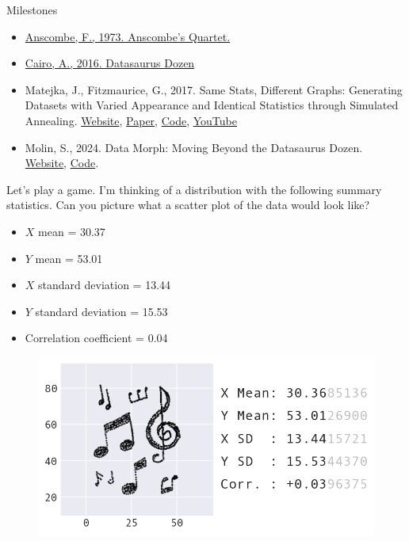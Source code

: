 \documentclass[10pt]{beamer}
\begin{document}
\begin{frame}{Milestones}
\begin{itemize}%
  \item\href{https://en.wikipedia.org/wiki/Anscombe\%27s_quartet}{Anscombe, F., 1973. Anscombe's Quartet.}
  \item\href{https://en.wikipedia.org/wiki/Datasaurus_dozen}{Cairo, A., 2016. Datasaurus Dozen} 
  \item Matejka, J., Fitzmaurice, G., 2017. Same Stats, Different Graphs: Generating Datasets with Varied Appearance and Identical Statistics through Simulated Annealing. \href{https://www.research.autodesk.com/publications/same-stats-different-graphs/}{Website}, \href{https://research.autodesk.com/app/uploads/2023/03/same-stats-different-graphs.pdf_rec2hRjLLGgM7Cn2T.pdf}{Paper}, \href{https://github.com/jmatejka/same-stats-different-graphs}{Code}, \href{https://www.youtube.com/watch?v=DbJyPELmhJc}{YouTube}
  \item Molin, S., 2024. Data Morph: Moving Beyond the Datasaurus Dozen. \href{https://stefaniemolin.com/articles/data-science/introducing-data-morph/}{Website}, \href{https://github.com/stefmolin/data-morph}{Code}.
\end{itemize}
\end{frame}

\begin{frame}
  Let's play a game. I'm thinking of a distribution with the following summary statistics. Can you picture what a scatter plot of the data would look like?
  \vspace{5mm}
  \begin{itemize}
    \item $X$ mean = 30.37
    \item $Y$ mean = 53.01
    \item $X$ standard deviation = 13.44
    \item $Y$ standard deviation = 15.53
    \item Correlation coefficient = 0.04
  \end{itemize}
\end{frame}

\begin{frame}
  \begin{figure}
  \includegraphics[width=.95\textwidth]{fig/note01/music-dataset.png}
  \end{figure}
\end{frame}
\end{document}
